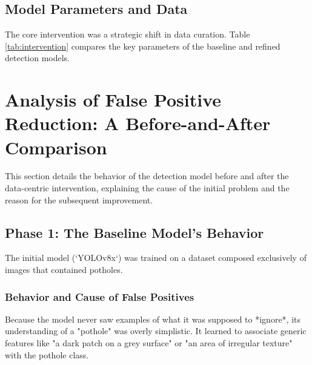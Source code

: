 \documentclass[twocolumn]{article}
\begin{document}
\subsection{Model Parameters and Data}
The core intervention was a strategic shift in data curation. Table \ref{tab:intervention} compares the key parameters of the baseline and refined detection models.

\begin{table}[H]
\centering
\caption{Comparison of Baseline and Refined Model Configurations}
\label{tab:intervention}
\end{table}

\section{Analysis of False Positive Reduction: A Before-and-After Comparison}
This section details the behavior of the detection model before and after the data-centric intervention, explaining the cause of the initial problem and the reason for the subsequent improvement.

\subsection{Phase 1: The Baseline Model's Behavior}
The initial model (`YOLOv8x`) was trained on a dataset composed exclusively of images that contained potholes.

\subsubsection{Behavior and Cause of False Positives}
Because the model never saw examples of what it was supposed to *ignore*, its understanding of a "pothole" was overly simplistic. It learned to associate generic features like "a dark patch on a grey surface" or "an area of irregular texture" with the pothole class.
\end{document}
